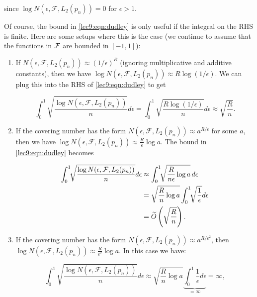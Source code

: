 since $\log N(\epsilon, \mathcal{F}, L_2(p_n))=0$ for $\epsilon >1$.


Of course, the bound in \eqref{lec9:eqn:dudley} is only useful if the integral on the RHS is finite. Here are some setups where this is the case (we continue to assume that the functions in $\mathcal F$ are bounded in $[-1, 1]$):

\begin{enumerate}
\item If $N(\epsilon, \mathcal{F}, L_2(p_n))\approx (1 / \epsilon)^R$ (ignoring multiplicative and additive constants), then we have $\log N(\epsilon, \mathcal{F}, L_2(p_n))\approx  R\log (1/\epsilon)$. We can plug this into the RHS of \eqref{lec9:eqn:dudley} to get
        
\begin{equation}
\int_{0}^{1}\sqrt{\frac{\log N(\epsilon, \mathcal{F}, L_2({p_n}))}{n}}d\epsilon = \int_{0}^1\sqrt{\frac{R\log(1/\epsilon)}{n}}d\epsilon \approx \sqrt{\frac{R}{n}}.
\end{equation}
            
\item If the covering number has the form $N(\epsilon, \mathcal{F}, L_2(p_n))\approx a^{R/\epsilon}$ for some $a$, then we have $\log N(\epsilon, \mathcal{F}, L_2(p_n)) \approx \frac{R}{\epsilon}\log a$. The bound in \eqref{lec9:eqn:dudley} becomes
        
\begin{align}
\int_0^1\!\!\sqrt{\frac{\log N(\epsilon, \mathcal{F}, L_2(p_n))}{n}}d\epsilon &\approx \int_0^1\!\!\sqrt{\frac{R}{n\epsilon}\log a}\, d\epsilon \\
&= \sqrt{\frac{R}{n}\log a} \int_0^1\!\!\sqrt{\frac{1}{\epsilon}}d\epsilon \\
&= \widetilde{O} \left(\sqrt{\frac{R}{n}}\right).
\end{align}
        
\item If the covering number has the form $N(\epsilon, \mathcal{F}, L_2(p_n))\approx a^{R/\epsilon^2}$, then $\log N(\epsilon, \mathcal{F}, L_2(p_n))\approx \frac{R}{\epsilon^2}\log a$. In this case we have:
        
\begin{equation}\int_0^1\sqrt{\frac{\log N(\epsilon, \mathcal{F}, L_2(p_n))}{n}}d\epsilon \approx \sqrt{\frac{R}{n}\log a} \underbrace{\int_0^1\frac{1}{\epsilon}d\epsilon}_{=\infty}=\infty,
\end{equation}


\end{enumerate}
